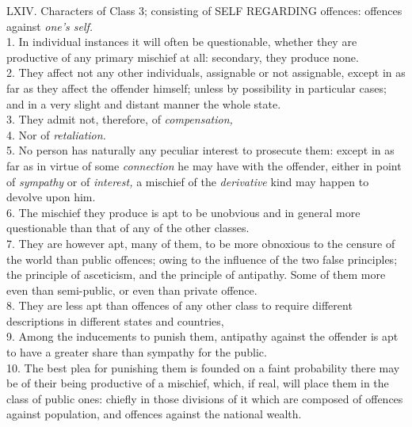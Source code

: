 \documentclass[12pt]{report}
\begin{document}
LXIV. Characters of Class 3; consisting of SELF REGARDING offences:
offences against \emph{one's self.} \emph{\\
}1. In individual instances it will often be questionable, whether they
are productive of any primary mischief at all: secondary, they produce
none.\\
2. They affect not any other individuals, assignable or not assignable,
except in as far as they affect the offender himself; unless by
possibility in particular cases; and in a very slight and distant manner
the whole state.\\
3. They admit not, therefore, of \emph{compensation,}\\
4. Nor of \emph{retaliation.}\\
5. No person has naturally any peculiar interest to prosecute them:
except in as far as in virtue of some \emph{connection} he may have with
the offender, either in point of \emph{sympathy} or of \emph{interest,}
a mischief of the \emph{derivative} kind may happen to devolve upon
him.\\
6. The mischief they produce is apt to be unobvious and in general more
questionable than that of any of the other classes.\\
7. They are however apt, many of them, to be more obnoxious to the
censure of the world than public offences; owing to the influence of the
two false principles; the principle of asceticism, and the principle of
antipathy. Some of them more even than semi-public, or even than private
offence.\\
8. They are less apt than offences of any other class to require
different descriptions in different states and countries,\\
9. Among the inducements to punish them, antipathy against the offender
is apt to have a greater share than sympathy for the public.\\
10. The best plea for punishing them is founded on a faint probability
there may be of their being productive of a mischief, which, if real,
will place them in the class of public ones: chiefly in those divisions
of it which are composed of offences against population, and offences
against the national wealth.
\end{document}
